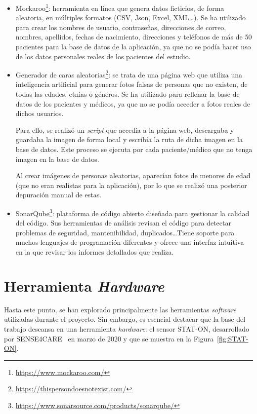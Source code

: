 \begin{itemize}
    \item Mockaroo\footnote{\url{https://www.mockaroo.com/}}: herramienta en línea que genera datos ficticios, de forma aleatoria, en múltiples formatos (CSV, Json, Excel, XML\ldots). Se ha utilizado para crear los nombres de usuario, contraseñas, direcciones de correo, nombres, apellidos, fechas de nacimiento, direcciones y teléfonos de más de 50 pacientes para la base de datos de la aplicación, ya que no se podía hacer uso de los datos personales reales de los pacientes del estudio.

    \item Generador de caras aleatorias\footnote{\url{https://thispersondoesnotexist.com/}}: se trata de una página web que utiliza una inteligencia artificial para generar fotos falsas de personas que no existen, de todas las edades, etnias o géneros. Se ha utilizado para rellenar la base de datos de los pacientes y médicos, ya que no se podía acceder a fotos reales de dichos usuarios.
    
    Para ello, se realizó un \textit{script} que accedía a la página web, descargaba y guardaba la imagen de forma local y escribía la ruta de dicha imagen en la base de datos. Este proceso se ejecuta por cada paciente/médico que no tenga imagen en la base de datos. 
    
    Al crear imágenes de personas aleatorias, aparecían fotos de menores de edad (que no eran realistas para la aplicación), por lo que se realizó una posterior depuración manual de estas.

    \item SonarQube\footnote{\url{https://www.sonarsource.com/products/sonarqube/}}: plataforma de código abierto diseñada para gestionar la calidad del código. Sus herramientas de análisis revisan el código para detectar problemas de seguridad, mantenibilidad, duplicados\ldots Tiene soporte para muchos lenguajes de programación diferentes y ofrece una interfaz intuitiva en la que revisar los informes detallados que realiza.
\end{itemize}



\section{Herramienta \textit{Hardware}}
Hasta este punto, se han explorado principalmente las herramientas \textit{software} utilizadas durante el proyecto. Sin embargo, es esencial destacar que la base del trabajo descansa en una herramienta \textit{hardware}: el sensor STAT-ON, desarrollado por SENSE4CARE~\cite{sense4care} en marzo de 2020 y que se muestra en la Figura~\ref{fig:STAT-ON}. 

